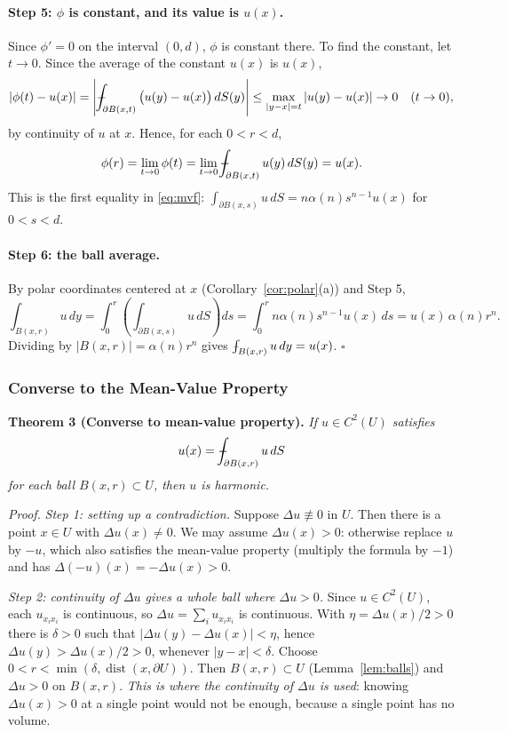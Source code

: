 \documentclass[11pt]{article}
\def\Xint#1{\mathchoice
  {\XXint\displaystyle\textstyle{#1}}%
  {\XXint\textstyle\scriptstyle{#1}}%
  {\XXint\scriptstyle\scriptscriptstyle{#1}}%
  {\XXint\scriptscriptstyle\scriptscriptstyle{#1}}%
  \!\int}
\def\XXint#1#2#3{{\setbox0=\hbox{$#1{#2#3}{\int}$}
  \vcenter{\hbox{$#2#3$}}\kern-.5\wd0}}
\def\fint{\Xint-}
\theoremstyle{plain}
\theoremstyle{definition}
\theoremstyle{remark}
\begin{document}
\paragraph{Step 5: $\phi$ is constant, and its value is $u(x)$.} Since $\phi' = 0$ on the interval $(0,d)$, $\phi$ is constant there. To find the constant, let $t \to 0$. Since the average of the constant $u(x)$ is $u(x)$,
$$ |\phi(t) - u(x)| = \left| \fint_{\partial B(x,t)} \big(u(y) - u(x)\big)\, dS(y) \right| \leq \max_{|y - x| = t}|u(y) - u(x)| \to 0 \quad (t \to 0), $$
by continuity of $u$ at $x$. Hence, for each $0 < r < d$,
$$ \phi(r) = \lim_{t\to 0}\phi(t) = \lim_{t \to 0} \fint_{\partial B(x,t)} u(y)\, dS(y) = u(x). $$
This is the first equality in \eqref{eq:mvf}: $\int_{\partial B(x,s)} u\, dS = n\alpha(n)s^{n-1}u(x)$ for $0 < s < d$.

\paragraph{Step 6: the ball average.} By polar coordinates centered at $x$ (Corollary~\ref{cor:polar}(a)) and Step 5,
$$ \int_{B(x,r)} u\, dy = \int_0^r \left( \int_{\partial B(x,s)} u\, dS \right) ds = \int_0^r n\alpha(n)s^{n-1} u(x)\, ds = u(x)\,\alpha(n) r^n. $$
Dividing by $|B(x,r)| = \alpha(n)r^n$ gives $\fint_{B(x,r)} u\, dy = u(x)$. $\square$

\subsubsection{Converse to the Mean-Value Property}
\textbf{Theorem 3 (Converse to mean-value property).} \textit{If $u \in C^2(U)$ satisfies}
$$ u(x) = \fint_{\partial B(x,r)} u\, dS $$
\textit{for each ball $B(x,r) \subset U$, then $u$ is harmonic.}

\textit{Proof.} \emph{Step 1: setting up a contradiction.} Suppose $\Delta u \not\equiv 0$ in $U$. Then there is a point $x \in U$ with $\Delta u(x) \neq 0$. We may assume $\Delta u(x) > 0$: otherwise replace $u$ by $-u$, which also satisfies the mean-value property (multiply the formula by $-1$) and has $\Delta(-u)(x) = -\Delta u(x) > 0$.

\emph{Step 2: continuity of $\Delta u$ gives a whole ball where $\Delta u > 0$.} Since $u \in C^2(U)$, each $u_{x_ix_i}$ is continuous, so $\Delta u = \sum_i u_{x_i x_i}$ is continuous. With $\eta = \Delta u(x)/2 > 0$ there is $\delta > 0$ such that $|\Delta u(y) - \Delta u(x)| < \eta$, hence $\Delta u(y) > \Delta u(x)/2 > 0$, whenever $|y - x| < \delta$. Choose $0 < r < \min(\delta, \operatorname{dist}(x,\partial U))$. Then $B(x,r) \subset U$ (Lemma~\ref{lem:balls}) and $\Delta u > 0$ on $B(x,r)$. \emph{This is where the continuity of $\Delta u$ is used}: knowing $\Delta u(x) > 0$ at a single point would not be enough, because a single point has no volume.
\end{document}
